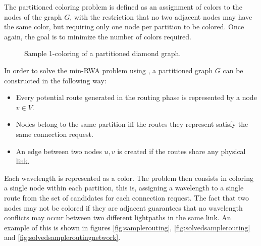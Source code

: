 The partitioned coloring problem is defined as an assignment of colors to the nodes of the graph $G$, with the restriction that no two adjacent nodes may have the same color, but requiring only one node per partition to be colored. Once again, the goal is to minimize the number of colors required.

\begin{figure}[h]
	\centering
\caption{Sample 1-coloring of a partitioned diamond graph.}
	\label{fig:samplepartitionedcoloring}
\end{figure}

In order to solve the min-RWA problem using \PCP{}, a partitioned graph $G$ can be constructed in the following way:
\begin{itemize}
\item{Every potential route generated in the routing phase is represented by a node $v \in V$.}
\item{Nodes belong to the same partition iff the routes they represent satisfy the same connection request.}
\item{An edge between two nodes $u,v$ is created if the routes share any physical link.}
\end{itemize}

\samplerouting

Each wavelength is represented as a color. The problem then consists in coloring a single node within each partition, this is, assigning a wavelength to a single route from the set of candidates for each connection request. The fact that two nodes may not be colored if they are adjacent guarantees  that no wavelength conflicts may occur between two different lightpaths in the same link. An example of this is shown in figures \ref{fig:samplerouting}, \ref{fig:solvedsamplerouting} and \ref{fig:solvedsampleroutingnetwork}.

